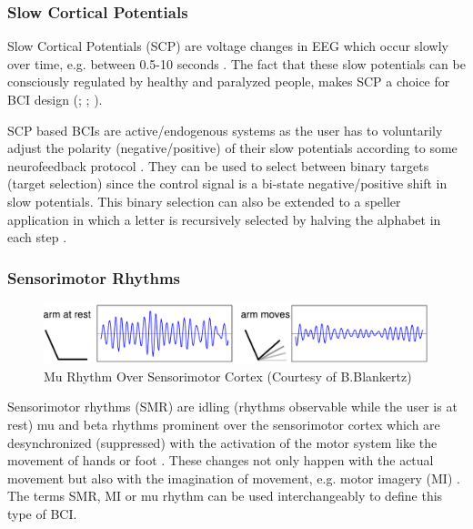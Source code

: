\documentclass[12pt]{article}
\newcommand\mysubsubsection[1]{\subsubsection{#1}}
\numberwithin{equation}{section}
\numberwithin{figure}{section}
\numberwithin{table}{section}
\begin{document}
\mysubsubsection{Slow Cortical Potentials}\label{seq:bci_scp}
\par{
    Slow Cortical Potentials (SCP) are voltage changes in EEG which occur
    slowly over time, e.g. between 0.5-10 seconds \citep{wolpaw_brain_2010}.
    The fact that these slow potentials can be consciously regulated
    by healthy and paralyzed people, makes SCP a choice for BCI design
    (\citealp{birbaumer_thought_2000}; \citealp{hinterberger_brain-computer_2004}; \citealp{birbaumer_breaking_2006}).
}
\par{
    SCP based BCIs are active/endogenous systems as the user has to voluntarily adjust
    the polarity (negative/positive) of their slow potentials according to some neurofeedback protocol \citep{jackson_neural_2010}.
    They can be used to select between binary targets (target selection) since the control signal is a bi-state
    negative/positive shift in slow potentials. This binary selection can also be extended
    to a speller application in which a letter is recursively selected by halving
    the alphabet in each step \citep{birbaumer_thought_2000}.
}

\mysubsubsection{Sensorimotor Rhythms}\label{seq:bci_motor}
\par{
    \begin{figure}[ht]
        \centering
        \includegraphics[scale=0.7]{images/motor_imagery}
        \caption[Mu Rhythm Over Sensorimotor Cortex]{Mu Rhythm Over Sensorimotor Cortex (Courtesy of B.Blankertz)}
        \label{fig:eeg_motor_imagery}
    \end{figure}

    Sensorimotor rhythms (SMR) are idling (rhythms observable while the
    user is at rest) mu and beta rhythms prominent over the sensorimotor cortex which are desynchronized
    (suppressed) with the activation of the motor system like the movement
    of hands or foot \citep{sellers_bcis_2010}. These changes not only happen
    with the actual movement but also with the imagination of movement, e.g. motor imagery (MI) \citep{mcfarland_braincomputer_2006}.
    The terms SMR, MI or mu rhythm can be used interchangeably to define this
    type of BCI.
}
\par{
}
\end{document}
